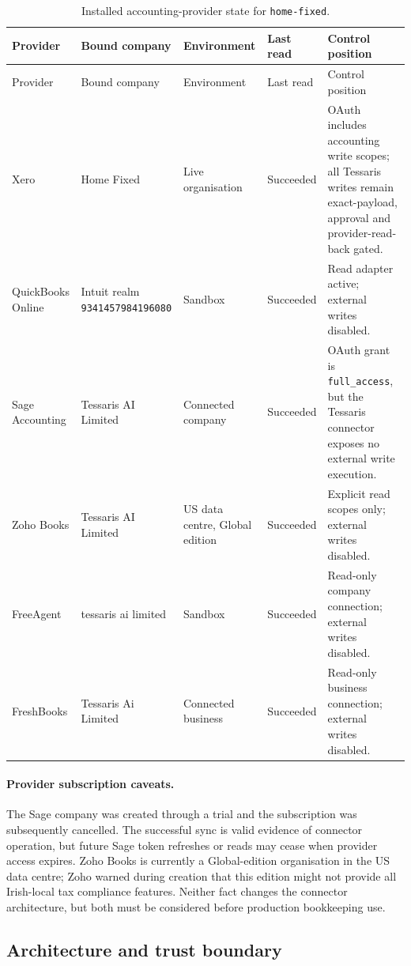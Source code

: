 \begin{longtable}{@{}p{}p{}p{}p{}p{}@{}}
\caption{Installed accounting-provider state for \texttt{home-fixed}.}
\label{tab:accounting-installed-state}\\
\toprule
Provider & Bound company & Environment & Last read & Control position \\
\midrule
\endfirsthead
\toprule
Provider & Bound company & Environment & Last read & Control position \\
\midrule
\endhead
Xero & Home Fixed & Live organisation & Succeeded & OAuth includes accounting write scopes; all Tessaris writes remain exact-payload, approval and provider-read-back gated. \\
QuickBooks Online & Intuit realm \texttt{9341457984196080} & Sandbox & Succeeded & Read adapter active; external writes disabled. \\
Sage Accounting & Tessaris AI Limited & Connected company & Succeeded & OAuth grant is \texttt{full\_access}, but the Tessaris connector exposes no external write execution. \\
Zoho Books & Tessaris AI Limited & US data centre, Global edition & Succeeded & Explicit read scopes only; external writes disabled. \\
FreeAgent & tessaris ai limited & Sandbox & Succeeded & Read-only company connection; external writes disabled. \\
FreshBooks & Tessaris Ai Limited & Connected business & Succeeded & Read-only business connection; external writes disabled. \\
\bottomrule
\end{longtable}

\paragraph{Provider subscription caveats.}
The Sage company was created through a trial and the subscription was
subsequently cancelled.  The successful sync is valid evidence of connector
operation, but future Sage token refreshes or reads may cease when provider
access expires.  Zoho Books is currently a Global-edition organisation in the
US data centre; Zoho warned during creation that this edition might not provide
all Irish-local tax compliance features.  Neither fact changes the connector
architecture, but both must be considered before production bookkeeping use.

\subsection{Architecture and trust boundary}

